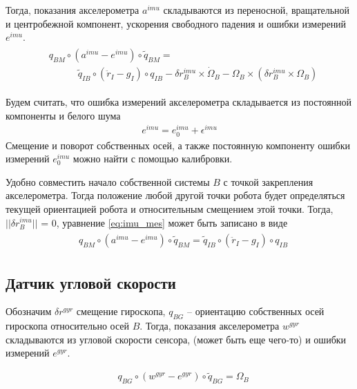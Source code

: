 \documentclass[a4paper,12pt]{article}
\begin{document}
Тогда, показания акселерометра $a^{imu}$ складываются из переносной, вращательной и центробежной компонент, ускорения свободного падения и ошибки измерений $e^{imu}$.
\begin{align} 
\begin{split} \label{eq:imu_mes}
&q_{BM} \circ (a^{imu} - e^{imu}) \circ \tilde{q}_{BM} = \\
&\quad \quad \quad \tilde{q}_{IB} \circ (\ddot{r}_{I} - g_I) \circ {q}_{IB}
 - {\delta r^{imu}_B}  \times \dot{\Omega}_B
 - \Omega_B \times (\delta r^{imu}_B \times \Omega_B)
\end{split}
\end{align}

Будем считать, что ошибка измерений акселерометра складывается из постоянной компоненты  и белого шума
\begin{align} 
e^{imu} = e_{0}^{imu} + \epsilon^{imu}
\end{align}
Смещение и поворот собственных осей, а также постоянную компоненту ошибки измерений $e_{0}^{imu}$ можно найти с помощью калибровки.

Удобно совместить начало собственной системы $B$ с точкой закрепления акселерометра. Тогда положение любой другой точки робота будет определяться текущей ориентацией робота и относительным смещением этой точки. Тогда, $||\delta r^{imu}_B||$ = 0, уравнение \eqref{eq:imu_mes} может быть записано в виде
\begin{align} 
\begin{split} \label{eq:imu_mes_simled}
&q_{BM} \circ (a^{imu} - e^{imu}) \circ \tilde{q}_{BM} = \tilde{q}_{IB} \circ (\ddot{r}_{I} - g_I) \circ {q}_{IB}
\end{split}
\end{align}

\subsection{Датчик угловой скорости}
Обозначим $\delta r^{\textit{gyr}}$ смещение гироскопа,  $q_{BG}$ -- ориентацию собственных осей гироскопа относительно осей $B$. Тогда, показания акселерометра $w^{\textit{gyr}}$ складываются из угловой скорости сенсора, (может быть еще чего-то) и ошибки измерений $e^{\textit{gyr}}$.

\begin{align} 
&q_{BG} \circ (w^{\textit{gyr}} - e^{\textit{gyr}}) \circ \tilde{q}_{BG} = 
\Omega_B
\\
\end{align}
\end{document}
